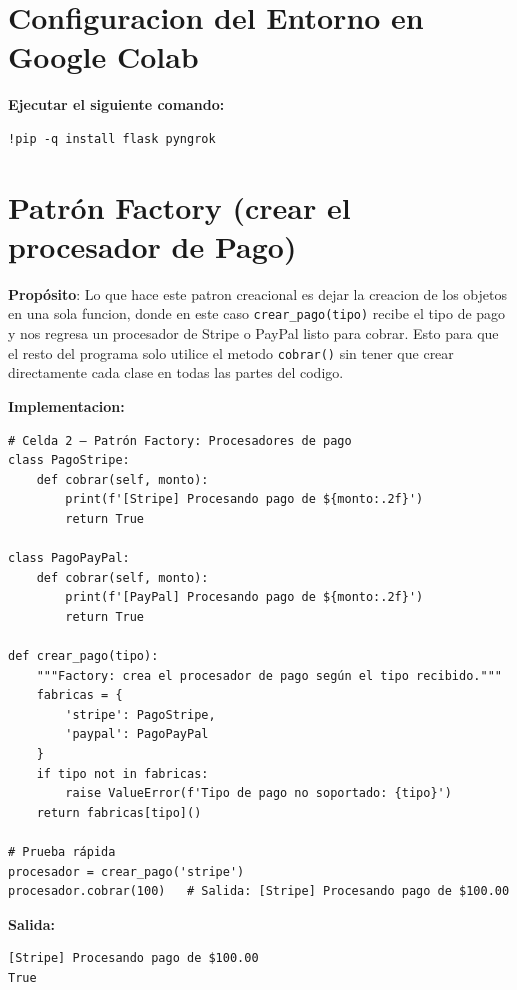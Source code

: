 \documentclass[letterpaper,11pt]{article}
\begin{document}


\newpage
{\hypersetup{linkcolor=black}\tableofcontents}

\newpage

\setcounter{page}{1}
\singlespacing


\section{Configuracion del Entorno en Google Colab}

\textbf{Ejecutar el siguiente comando:}

\begin{lstlisting}[style=pythonreport]
!pip -q install flask pyngrok
\end{lstlisting}

\section*{Patrón Factory (crear el procesador de Pago)}

\textbf{Propósito}: Lo que hace este patron creacional es dejar la creacion de los objetos en una sola funcion, donde en este caso \texttt{crear\_pago(tipo)} recibe el tipo de pago y nos regresa un procesador de Stripe o PayPal listo para cobrar. Esto para que el resto del programa solo utilice el metodo \texttt{cobrar()} sin tener que crear directamente cada clase en todas las partes del codigo.

\textbf{Implementacion:}

\begin{lstlisting}[style=pythonreport]
# Celda 2 – Patrón Factory: Procesadores de pago
class PagoStripe:
    def cobrar(self, monto):
        print(f'[Stripe] Procesando pago de ${monto:.2f}')
        return True

class PagoPayPal:
    def cobrar(self, monto):
        print(f'[PayPal] Procesando pago de ${monto:.2f}')
        return True

def crear_pago(tipo):
    """Factory: crea el procesador de pago según el tipo recibido."""
    fabricas = {
        'stripe': PagoStripe,
        'paypal': PagoPayPal
    }
    if tipo not in fabricas:
        raise ValueError(f'Tipo de pago no soportado: {tipo}')
    return fabricas[tipo]()

# Prueba rápida
procesador = crear_pago('stripe')
procesador.cobrar(100)   # Salida: [Stripe] Procesando pago de $100.00
\end{lstlisting}
\par\noindent\textbf{Salida:}
\begin{lstlisting}[style=reportoutput,language={}]
[Stripe] Procesando pago de $100.00
True
\end{lstlisting}
\end{document}
